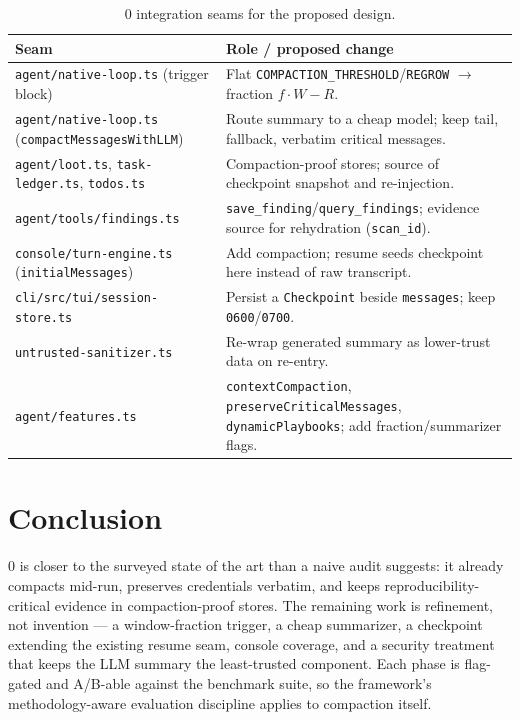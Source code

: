 \documentclass[11pt]{article}
\begin{document}
\begin{table}[t]
\centering
\small
\begin{tabular}{@{}p{4.6cm}p{8.4cm}@{}}
\toprule
\textbf{Seam} & \textbf{Role / proposed change} \\
\midrule
\texttt{agent/native-loop.ts} (trigger block) &
Flat \texttt{COMPACTION\_THRESHOLD}/\texttt{REGROW} $\to$ fraction $f\cdot W - R$. \\
\texttt{agent/native-loop.ts} \newline (\texttt{compactMessagesWithLLM}) &
Route summary to a cheap model; keep tail, fallback, verbatim critical messages. \\
\texttt{agent/loot.ts}, \texttt{task-ledger.ts}, \texttt{todos.ts} &
Compaction-proof stores; source of checkpoint snapshot and re-injection. \\
\texttt{agent/tools/findings.ts} &
\texttt{save\_finding}/\texttt{query\_findings}; evidence source for rehydration
(\texttt{scan\_id}). \\
\texttt{console/turn-engine.ts} (\texttt{initialMessages}) &
Add compaction; resume seeds checkpoint here instead of raw transcript. \\
\texttt{cli/src/tui/session-store.ts} &
Persist a \texttt{Checkpoint} beside \texttt{messages}; keep \texttt{0600}/\texttt{0700}. \\
\texttt{untrusted-sanitizer.ts} &
Re-wrap generated summary as lower-trust data on re-entry. \\
\texttt{agent/features.ts} &
\texttt{contextCompaction}, \texttt{preserveCriticalMessages}, \texttt{dynamicPlaybooks}; add fraction/summarizer flags. \\
\bottomrule
\end{tabular}
\caption{0 integration seams for the proposed design.}
\label{tab:seams}
\end{table}

\section{Conclusion}

0 is closer to the surveyed state of the art than a naive audit suggests: it
already compacts mid-run, preserves credentials verbatim, and keeps
reproducibility-critical evidence in compaction-proof stores. The remaining work
is refinement, not invention --- a window-fraction trigger, a cheap summarizer, a
checkpoint extending the existing resume seam, console coverage, and a security
treatment that keeps the LLM summary the least-trusted component. Each phase is
flag-gated and A/B-able against the benchmark suite, so the framework's
methodology-aware evaluation discipline applies to compaction itself.
\end{document}
